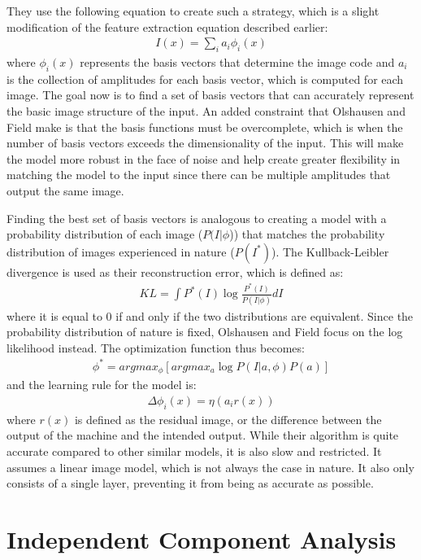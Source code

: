 \documentclass{article}
\begin{document}
They use the following equation to create such a strategy, which is a slight modification of the feature extraction equation described earlier:
\begin{align*}
    I(x) = \sum_i a_i \phi_i (x)
\end{align*}
where $\phi_i (x)$ represents the basis vectors that determine the image code and $a_i$ is the collection of amplitudes for each basis vector, which is computed for each image. The goal now is to find a set of basis vectors that can accurately represent the basic image structure of the input. An added constraint that Olshausen and Field make is that the basis functions must be overcomplete, which is when the number of basis vectors exceeds the dimensionality of the input. This will make the model more robust in the face of noise and help create greater flexibility in matching the model to the input since there can be multiple amplitudes that output the same image. 

Finding the best set of basis vectors is analogous to creating a model with a probability distribution of each image ($P(I | \phi$)) that matches the probability distribution of images experienced in nature ($P(I^*)$). The Kullback-Leibler divergence is used as their reconstruction error, which is defined as:
\begin{align*}
   KL = \int P^*(I) \log \frac{P^*(I)}{P(I | \phi)} dI
\end{align*}
where it is equal to 0 if and only if the two distributions are equivalent. Since the probability distribution of nature is fixed, Olshausen and Field focus on the log likelihood instead. The optimization function thus becomes:
\begin{align*}
   \phi^* = argmax_\phi [ argmax_a \log P(I | a, \phi) P(a) ]
\end{align*}
and the learning rule for the model is:
\begin{align*}
   \Delta \phi_i (x) = \eta (a_i r(x))
\end{align*}
where $r(x)$ is defined as the residual image, or the difference between the output of the machine and the intended output. While their algorithm is quite accurate compared to other similar models, it is also slow and restricted. It assumes a linear image model, which is not always the case in nature. It also only consists of a single layer, preventing it from being as accurate as possible.

\section{Independent Component Analysis}
\end{document}
